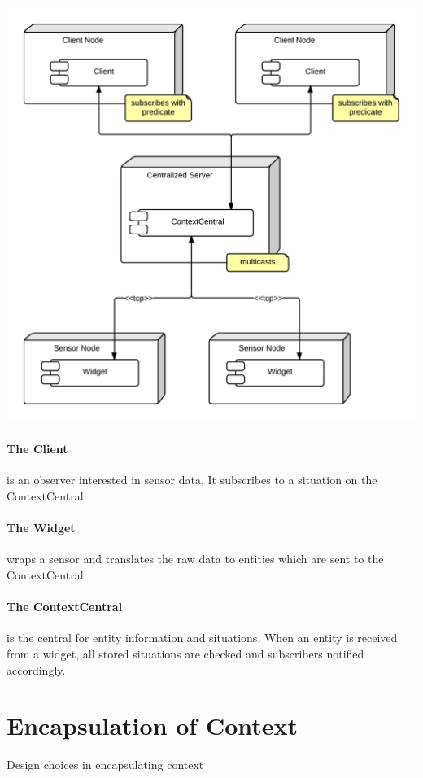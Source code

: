 \documentclass[]{report}
\begin{document}
\begin{center}
\includegraphics[scale=0.2]{ComponentDiagram.png}
\end{center}


\paragraph{The Client} is an observer interested in sensor data. It subscribes to a situation on the ContextCentral.

\paragraph{The Widget} wraps a sensor and translates the raw data to entities which are sent to the ContextCentral.

\paragraph{The ContextCentral} is the central for entity information and situations. When an entity is received from a widget, all stored situations are checked and subscribers notified accordingly.



\section{Encapsulation of Context}
Design choices in encapsulating context
\end{document}
